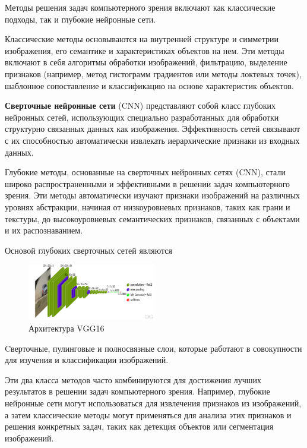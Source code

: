 
Методы решения задач компьютерного зрения включают как классические подходы, так и глубокие нейронные сети.

Классические методы основываются на внутренней структуре и симметрии изображения, 
его семантике и характеристиках объектов на нем. 
Эти методы включают в себя алгоритмы обработки изображений,
 фильтрацию, выделение признаков (например, метод гистограмм градиентов или методы локтевых точек),
  шаблонное сопоставление и классификацию на основе характеристик объектов.

\textbf{Сверточные нейронные сети} (CNN)\cite{lecun1989handwritten} представляют собой класс глубоких нейронных сетей,
использующих
специально разработанных для обработки структурно связанных данных как изображения. 
Эффективность сетей связывают с их способностью автоматически извлекать иерархические признаки из входных данных.

Глубокие методы, основанные на сверточных нейронных сетях (CNN), 
стали широко распространенными и эффективными в решении задач компьютерного зрения. 
Эти методы автоматически изучают признаки изображений на различных уровнях абстракции, 
начиная от низкоуровневых признаков, таких как грани и текстуры, до высокоуровневых семантических признаков,
 связанных с объектами и их распознаванием. 
 
Основой глубоких сверточных сетей являются

\begin{figure}[h]
    \centering
    \includegraphics[width=0.5\textwidth]{assets/ml/cv/vgg16.jpg}
    \caption{Архитектура VGG16 \cite{simonyan2014very}}
    \label{vgg_arch}
\end{figure}

Cверточные, пулинговые и полносвязные слои, которые работают в совокупности для изучения и классификации изображений.

Эти два класса методов часто комбинируются для достижения лучших результатов в решении задач компьютерного зрения. Например, глубокие нейронные сети могут использоваться для извлечения признаков из изображений, а затем классические методы могут применяться для анализа этих признаков и решения конкретных задач, таких как детекция объектов или сегментация изображений.


